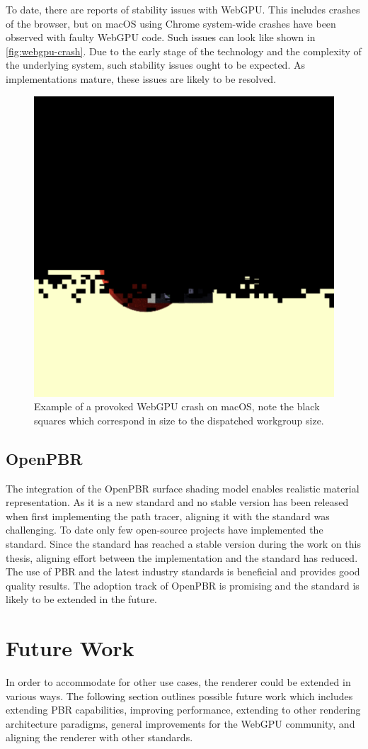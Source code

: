 To date, there are reports of stability issues with \gls{WebGPU}. This includes crashes of the browser, but on macOS using Chrome system-wide crashes have been observed with faulty \gls{WebGPU} code. Such issues can look like shown in \autoref{fig:webgpu-crash}. Due to the early stage of the technology and the complexity of the underlying system, such stability issues ought to be expected. As implementations mature, these issues are likely to be resolved.

\begin{figure}[H]
  \centering
  \includegraphics[width=0.25\columnwidth]{resources/webgpu-crashes.png}
  \caption{Example of a provoked WebGPU crash on macOS, note the black squares which correspond in size to the dispatched workgroup size.}
  \label{fig:webgpu-crash}
\end{figure}

\subsection*{OpenPBR}

The integration of the \gls{OpenPBR} surface shading model enables realistic material representation. As it is a new standard and no stable version has been released when first implementing the path tracer, aligning it with the standard was challenging. To date only few open-source projects have implemented the standard. Since the standard has reached a stable version during the work on this thesis, aligning effort between the implementation and the standard has reduced. The use of \gls{PBR} and the latest industry standards is beneficial and provides good quality results. The adoption track of \gls{OpenPBR} is promising and the standard is likely to be extended in the future.

\section{Future Work}

In order to accommodate for other use cases, the renderer could be extended in various ways. The following section outlines possible future work which includes extending \gls{PBR} capabilities, improving performance, extending to other rendering architecture paradigms, general improvements for the \gls{WebGPU} community, and aligning the renderer with other standards.

